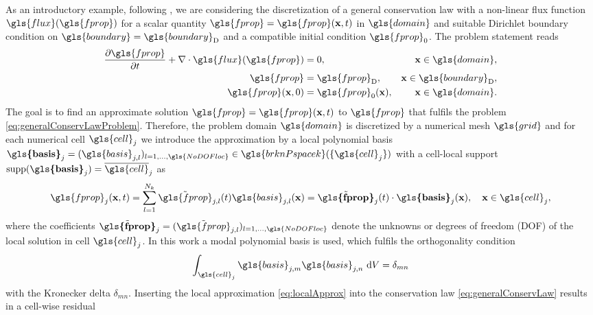 As an introductory example, following \textcite{hesthaven_nodal_2008}, we are considering the discretization of a general conservation law with a non-linear flux function $\gls{flux}(\gls{fprop})$ for a scalar quantity $\gls{fprop} = \gls{fprop}(\vectr{x},t)$ in $\gls{domain}$ and suitable Dirichlet boundary condition on $\gls{boundary} = \diri{\gls{boundary}}$ and a compatible initial condition $\gls{fprop}_0$. The problem statement reads 
\begin{subequations}
	\begin{align}
	\pDeriv{\gls{fprop}}{t} + \div{\gls{flux}(\gls{fprop})} &= 0, &\vectr{x} \in  \gls{domain},    \label{eq:generalConservLaw}\\
	\gls{fprop} &= \diri{\gls{fprop}}, &\vectr{x} \in \diri{\gls{boundary}},    
	\label{eq:generalConservLawBC}\\
	\gls{fprop}(\vectr{x}, 0) &= \gls{fprop}_0(\vectr{x}), &\vectr{x} \in  \gls{domain}.
	\label{eq:generalConservLawIC}
	\end{align}
	\label{eq:generalConservLawProblem}
\end{subequations}
The goal is to find an approximate solution $\gls{fprop} = \gls{fprop}(\vectr{x},t)$ to $\gls{fprop}$ that fulfils the problem \eqref{eq:generalConservLawProblem}. Therefore, the problem domain $\gls{domain}$ is discretized by a numerical mesh $\gls{grid}$ and for each numerical cell $\gls{cell}_j$ we introduce the approximation by a local polynomial basis $\vectr{\gls{basis}}_j = (\gls{basis}_{j,l})_{l=1,...,\gls{NoDOFloc}} \in \gls{brknPspacek}(\{\gls{cell}_j\})$ with a cell-local support $\textrm{supp}(\vectr{\gls{basis}}_j) = \overline{\gls{cell}}_j$ as
\begin{equation}
\gls{fprop}_j(\vectr{x},t) = \sum_{l=1}^{N_k} \tilde{\gls{fprop}}_{j,l}(t) \gls{basis}_{j,l}(\vectr{x}) = \tilde{\vectr{\gls{fprop}}}_{j}(t) \cdot \vectr{\gls{basis}}_{j}(\vectr{x}), \quad \vectr{x} \in \gls{cell}_j,
\label{eq:localApprox}
\end{equation}
where the coefficients $\tilde{\vectr{\gls{fprop}}}_{j} = (\tilde{\gls{fprop}}_{j,l})_{l=1,...,\gls{NoDOFloc}}$ denote the unknowns or degrees of freedom (DOF) of the local solution in cell $\gls{cell}_j$. In this work a modal polynomial basis is used, which fulfils the orthogonality condition
\begin{equation}
\int_{\gls{cell}_j}  \gls{basis}_{j,m} \gls{basis}_{j,n} \d{V} = \delta_{mn}
\end{equation}
with the Kronecker delta $\delta_{mn}$. Inserting the local approximation \eqref{eq:localApprox} into the conservation law \eqref{eq:generalConservLaw} results in a cell-wise residual 
